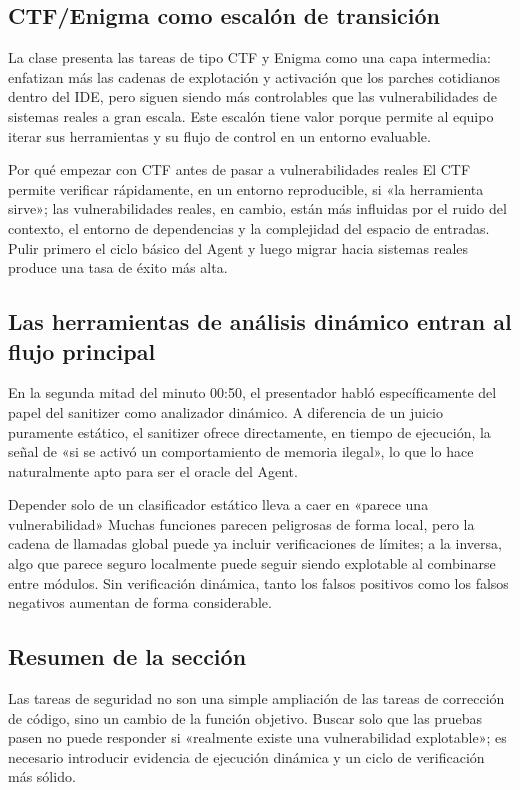 \documentclass[a4paper]{article}
\begin{document}
\subsection{CTF/Enigma como escalón de transición}
La clase presenta las tareas de tipo CTF y Enigma como una capa intermedia: enfatizan más las cadenas de explotación y activación que los parches cotidianos dentro del IDE, pero siguen siendo más controlables que las vulnerabilidades de sistemas reales a gran escala. Este escalón tiene valor porque permite al equipo iterar sus herramientas y su flujo de control en un entorno evaluable.

\begin{importantbox}{Por qué empezar con CTF antes de pasar a vulnerabilidades reales}
El CTF permite verificar rápidamente, en un entorno reproducible, si «la herramienta sirve»; las vulnerabilidades reales, en cambio, están más influidas por el ruido del contexto, el entorno de dependencias y la complejidad del espacio de entradas. Pulir primero el ciclo básico del Agent y luego migrar hacia sistemas reales produce una tasa de éxito más alta.
\end{importantbox}

\subsection{Las herramientas de análisis dinámico entran al flujo principal}
En la segunda mitad del minuto 00:50, el presentador habló específicamente del papel del sanitizer como analizador dinámico. A diferencia de un juicio puramente estático, el sanitizer ofrece directamente, en tiempo de ejecución, la señal de «si se activó un comportamiento de memoria ilegal», lo que lo hace naturalmente apto para ser el oracle del Agent.

\begin{warningbox}{Depender solo de un clasificador estático lleva a caer en «parece una vulnerabilidad»}
Muchas funciones parecen peligrosas de forma local, pero la cadena de llamadas global puede ya incluir verificaciones de límites; a la inversa, algo que parece seguro localmente puede seguir siendo explotable al combinarse entre módulos. Sin verificación dinámica, tanto los falsos positivos como los falsos negativos aumentan de forma considerable.
\end{warningbox}

\subsection{Resumen de la sección}
Las tareas de seguridad no son una simple ampliación de las tareas de corrección de código, sino un cambio de la función objetivo. Buscar solo que las pruebas pasen no puede responder si «realmente existe una vulnerabilidad explotable»; es necesario introducir evidencia de ejecución dinámica y un ciclo de verificación más sólido.
\end{document}
